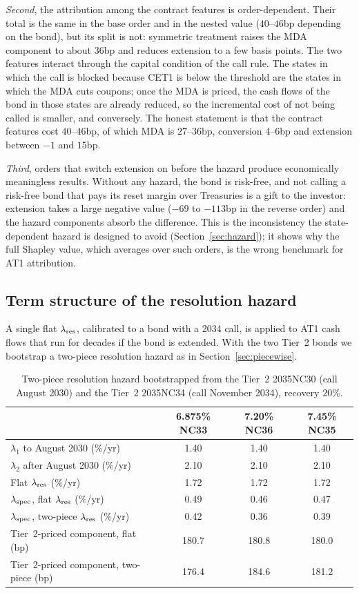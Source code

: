 \emph{Second}, the attribution among the contract features is order-dependent. Their total
is the same in the base order and in the nested value ($40$--$46$bp depending on the bond),
but its split is not: symmetric treatment raises the MDA component to about $36$bp and
reduces extension to a few basis points. The two features interact through the capital
condition of the call rule. The states in which the call is blocked because CET1 is below the
threshold are the states in which the MDA cuts coupons; once the MDA is priced, the
cash flows of the bond in those states are already reduced, so the incremental cost of not
being called is smaller, and conversely. The honest statement is that the contract features
cost $40$--$46$bp, of which MDA is $27$--$36$bp, conversion $4$--$6$bp and extension between
$-1$ and $15$bp.

\emph{Third}, orders that switch extension on before the hazard produce economically
meaningless results. Without any hazard, the bond is risk-free, and not calling a risk-free
bond that pays its reset margin over Treasuries is a gift to the investor: extension takes a
large negative value ($-69$ to $-113$bp in the reverse order) and the hazard components absorb
the difference. This is the inconsistency the state-dependent hazard is designed to avoid
(Section~\ref{sec:hazard}); it shows why the full Shapley value, which averages over such orders,
is the wrong benchmark for AT1 attribution.

\subsection{Term structure of the resolution hazard}

A single flat $\lambda_{\mathrm{res}}$, calibrated to a bond with a 2034 call, is applied to AT1 cash flows
that run for decades if the bond is extended. With the two Tier~2 bonds we bootstrap a
two-piece resolution hazard as in Section~\ref{sec:piecewise}.

\begin{table}[H]
\centering
\begin{tabular}{lccc}
\toprule
 & 6.875\% NC33 & 7.20\% NC36 & 7.45\% NC35 \\
\midrule
$\lambda_1$ to August 2030 (\%/yr) & 1.40 & 1.40 & 1.40 \\
$\lambda_2$ after August 2030 (\%/yr) & 2.10 & 2.10 & 2.10 \\
Flat $\lambda_{\mathrm{res}}$ (\%/yr) & 1.72 & 1.72 & 1.72 \\
$\lambda_{\mathrm{spec}}$, flat $\lambda_{\mathrm{res}}$ (\%/yr) & 0.49 & 0.46 & 0.47 \\
$\lambda_{\mathrm{spec}}$, two-piece $\lambda_{\mathrm{res}}$ (\%/yr) & 0.42 & 0.36 & 0.39 \\
Tier~2-priced component, flat (bp) & 180.7 & 180.8 & 180.0 \\
Tier~2-priced component, two-piece (bp) & 176.4 & 184.6 & 181.2 \\
\bottomrule
\end{tabular}
\caption{Two-piece resolution hazard bootstrapped from the Tier~2 2035NC30 (call August 2030)
and the Tier~2 2035NC34 (call November 2034), recovery $20\%$.}
\label{tab:termstructure}
\end{table}

